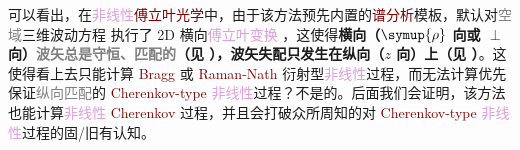 可以看出，在\textcolor{Plum}{非线性}\textcolor{Maroon}{傅立叶光学}中，由于该方法预先内置的\textcolor{Maroon}{谱分析}模板，默认对\textcolor{gray}{空域}三维波动方程  执行了 2D 横向\textcolor{Plum}{傅立叶变换} ，这使得\textbf{横向（$\symup{\rho}$ 向或 $\perp$ 向）\textcolor{gray}{波矢总是守恒、匹配的}（见 ），\textcolor{PineGreen}{波矢失配}只发生在纵向（$z$ 向）上（见 ）}。这使得看上去只能计算 \textcolor{Maroon}{Bragg} 或 \textcolor{Maroon}{Raman-Nath} 衍射型\textcolor{Plum}{非线性}过程，而无法计算优先保证\textcolor{gray}{纵向匹配}的 \textcolor{Maroon}{Cherenkov-type} \textcolor{Plum}{非线性}过程？不是的。后面我们会证明，该方法也能计算\textcolor{Plum}{非线性} \textcolor{Maroon}{Cherenkov} 过程，并且会打破众所周知的对 \textcolor{Maroon}{Cherenkov-type} \textcolor{Plum}{非线性}过程的固/旧有认知。

